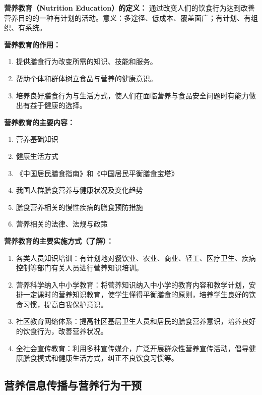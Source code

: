 \begin{defbox}
\textbf{营养教育（Nutrition Education）的定义：}
通过改变人们的饮食行为达到改善营养目的的一种有计划的活动。意义：多途径、低成本、覆盖面广；有计划、有组织、有系统。

\textbf{营养教育的作用：}
\begin{enumerate}[leftmargin=*]
    \item 提供膳食行为改变所需的知识、技能和服务。
    \item 帮助个体和群体树立食品与营养的健康意识。
    \item 培养良好膳食行为与生活方式，使人们在面临营养与食品安全问题时有能力做出有益于健康的选择。
\end{enumerate}

\textbf{营养教育的主要内容：}%
\begin{enumerate}[leftmargin=*]
    \item 营养基础知识
    \item 健康生活方式
    \item 《中国居民膳食指南》和《中国居民平衡膳食宝塔》
    \item 我国人群膳食营养与健康状况及变化趋势
    \item 膳食营养相关的慢性疾病的膳食预防措施
    \item 营养相关的法律、法规与政策
\end{enumerate}

\textbf{营养教育的主要实施方式（了解）：}%
\begin{enumerate}[leftmargin=*]
    \item 各类人员知识培训：有计划地对餐饮业、农业、商业、轻工、医疗卫生、疾病控制等部门有关人员进行营养知识培训。
    \item 营养科学纳入中小学教育：将营养知识纳入中小学的教育内容和教学计划，安排一定课时的营养知识教育，使学生懂得平衡膳食的原则，培养学生良好的饮食习惯，提高自我保护意识。
    \item 社区教育网络体系：提高社区基层卫生人员和居民的膳食营养意识，培养良好的饮食行为，改善营养状况。
    \item 全社会宣传教育：利用多种宣传媒介，广泛开展群众性营养宣传活动，倡导健康膳食模式和健康生活方式，纠正不良饮食习惯等。
\end{enumerate}
\end{defbox}

\subsection{营养信息传播与营养行为干预}

